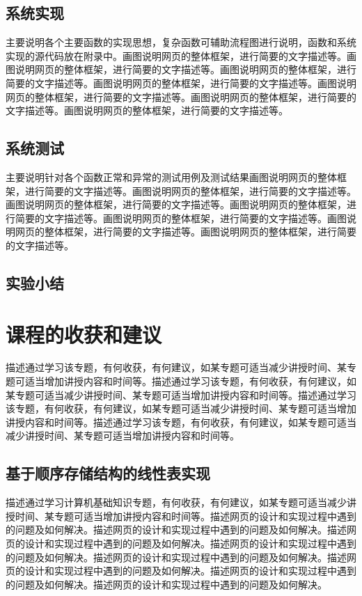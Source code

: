 \documentclass[supercite]{Experimental_Report}
\theoremstyle{definition}
\begin{document}
\subsection{系统实现}

主要说明各个主要函数的实现思想，复杂函数可辅助流程图进行说明，函数和系统实现的源代码放在附录中。画图说明网页的整体框架，进行简要的文字描述等。画图说明网页的整体框架，进行简要的文字描述等。画图说明网页的整体框架，进行简要的文字描述等。画图说明网页的整体框架，进行简要的文字描述等。画图说明网页的整体框架，进行简要的文字描述等。画图说明网页的整体框架，进行简要的文字描述等。画图说明网页的整体框架，进行简要的文字描述等。

\subsection{系统测试}

主要说明针对各个函数正常和异常的测试用例及测试结果画图说明网页的整体框架，进行简要的文字描述等。画图说明网页的整体框架，进行简要的文字描述等。画图说明网页的整体框架，进行简要的文字描述等。画图说明网页的整体框架，进行简要的文字描述等。画图说明网页的整体框架，进行简要的文字描述等。画图说明网页的整体框架，进行简要的文字描述等。画图说明网页的整体框架，进行简要的文字描述等。

\subsection{实验小结}

\newpage

\section{课程的收获和建议}

描述通过学习该专题，有何收获，有何建议，如某专题可适当减少讲授时间、某专题可适当增加讲授内容和时间等。描述通过学习该专题，有何收获，有何建议，如某专题可适当减少讲授时间、某专题可适当增加讲授内容和时间等。描述通过学习该专题，有何收获，有何建议，如某专题可适当减少讲授时间、某专题可适当增加讲授内容和时间等。描述通过学习该专题，有何收获，有何建议，如某专题可适当减少讲授时间、某专题可适当增加讲授内容和时间等。

\subsection{基于顺序存储结构的线性表实现}

描述通过学习计算机基础知识专题，有何收获，有何建议，如某专题可适当减少讲授时间、某专题可适当增加讲授内容和时间等。描述网页的设计和实现过程中遇到的问题及如何解决。描述网页的设计和实现过程中遇到的问题及如何解决。描述网页的设计和实现过程中遇到的问题及如何解决。描述网页的设计和实现过程中遇到的问题及如何解决。描述网页的设计和实现过程中遇到的问题及如何解决。描述网页的设计和实现过程中遇到的问题及如何解决。描述网页的设计和实现过程中遇到的问题及如何解决。描述网页的设计和实现过程中遇到的问题及如何解决。
\end{document}
